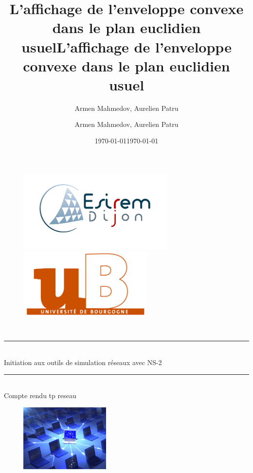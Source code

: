 \documentclass[11pt]{article}
\title{L'affichage de l'enveloppe convexe dans le plan euclidien usuel}
\author{Armen Mahmedov, Aurelien Patru}
\date{\today}
\title{L'affichage de l'enveloppe convexe dans le plan euclidien usuel}
\author{Armen Mahmedov, Aurelien Patru}
\date{\today}
\begin{document}
\begin{titlepage}
	\newcommand{\HRule}{\rule{\linewidth}{0.2mm}}     
            
	\begin{figure}[t]
		\begin{minipage}{0.5\textwidth}\large
			\begin{flushleft}
				\includegraphics[width=0.7\textwidth]{assets/logoEsirem.jpg}
			\end{flushleft}
		\end{minipage}
		\begin{minipage}{0.5\textwidth}\large
			\begin{flushright}
			\includegraphics[width=0.6\textwidth]{assets/logoUb.jpg}
			\end{flushright}
		\end{minipage}
	\end{figure}
	\textsc{ \\[1cm]}
     
     
	\begin{center}
	\HRule \\
	{\Large   
		Initiation aux outils de simulation réseaux avec NS-2
	}
	\HRule
	\\[0.5cm]
	{\large Compte rendu tp reseau \\}
   \end{center}

	\begin{figure}[h]
		\begin{center}
			\includegraphics[width=0.4\textwidth]{assets/main.jpg}
		\end{center}
	\end{figure}
        

\end{titlepage}
\end{document}
